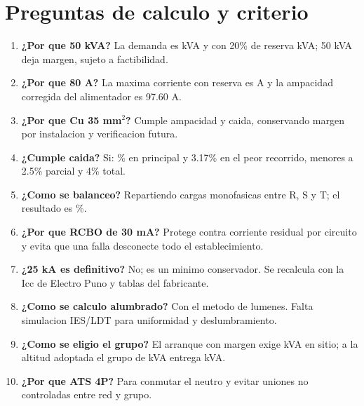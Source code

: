 \documentclass[12pt,letterpaper]{report}
\begin{document}
\chapter*{Preguntas de calculo y criterio}
\thispagestyle{memoria}
\begin{enumerate}
\item \textbf{¿Por que 50 kVA?} La demanda es \MaximaDemandaKVA{} kVA y con 20\% de reserva \DemandaReservaKVA{} kVA; 50 kVA deja margen, sujeto a factibilidad.
\item \textbf{¿Por que 80 A?} La maxima corriente con reserva es \CorrienteMaximaA{} A y la ampacidad corregida del alimentador es 97.60 A.
\item \textbf{¿Por que Cu 35 mm$^2$?} Cumple ampacidad y caida, conservando margen por instalacion y verificacion futura.
\item \textbf{¿Cumple caida?} Si: \CaidaPrincipal{}\% en principal y 3.17\% en el peor recorrido, menores a 2.5\% parcial y 4\% total.
\item \textbf{¿Como se balanceo?} Repartiendo cargas monofasicas entre R, S y T; el resultado es \DesbalanceFases{}\%.
\item \textbf{¿Por que RCBO de 30 mA?} Protege contra corriente residual por circuito y evita que una falla desconecte todo el establecimiento.
\item \textbf{¿25 kA es definitivo?} No; es un minimo conservador. Se recalcula con la Icc de Electro Puno y tablas del fabricante.
\item \textbf{¿Como se calculo alumbrado?} Con el metodo de lumenes. Falta simulacion IES/LDT para uniformidad y deslumbramiento.
\item \textbf{¿Como se eligio el grupo?} El arranque con margen exige \GrupoArranqueKVA{} kVA en sitio; a la altitud adoptada el grupo de \GrupoSeleccionadoKVA{} kVA entrega \GrupoDisponibleKVA{} kVA.
\item \textbf{¿Por que ATS 4P?} Para conmutar el neutro y evitar uniones no controladas entre red y grupo.
\end{enumerate}
\end{document}
